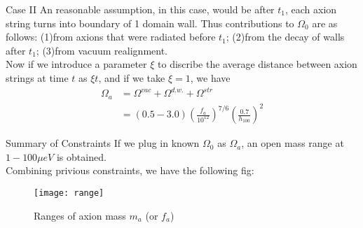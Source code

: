 \documentclass{beamer}
\begin{document}
\begin{frame}{Case II}
An reasonable assumption, in this case, would be after $t_1$, each axion string turns into boundary of \alert{1} domain wall. Thus  contributions to $\Omega_0$ are as follows: (1)from axions that were radiated before $t_1$; (2)from the decay of walls after $t_1$; (3)from vacuum realignment.\\
Now if we introduce a parameter $\xi$ to discribe the average distance between axion strings at time $t$ as $\xi t$, and if we take $\xi = 1$, we have\begin{equation*}
\begin{split}
\Omega_a &= \Omega^{vac}+\Omega^{d.w.}+\Omega^{str}\\
&= (0.5-3.0)(\frac{f_a}{10^{12}})^{7/6}(\frac{0.7}{h_{100}})^2
\end{split}
\end{equation*}
\end{frame}
\begin{frame}{Summary of Constraints}
If we plug in known $\Omega_0$ as $\Omega_a$, an open mass range at $1-100 \mu eV$ is obtained.\\
Combining privious constraints, we have the following fig:
\begin{figure}
\centering
\texttt{[image: range]}
\caption{Ranges of axion mass $m_a$ (or $f_a$)}
\end{figure}
\end{frame}

\end{document}
